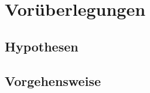 \chapter{Vorüberlegungen}
\label{chap:voruberlegungen}
\section{Hypothesen}
\label{sec:hypothesen}
\section{Vorgehensweise}
\label{sec:vorgehensweise}
